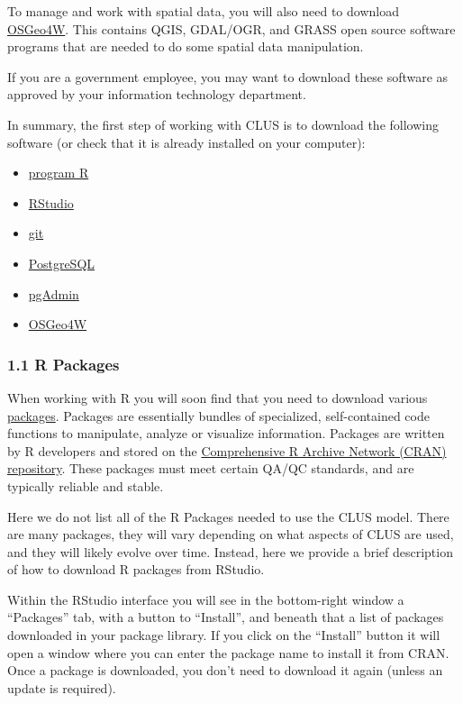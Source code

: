 \documentclass[
]{article}
\providecommand{\tightlist}{%
  \setlength{\itemsep}{0pt}\setlength{\parskip}{0pt}}
\begin{document}
To manage and work with spatial data, you will also need to download
\href{https://trac.osgeo.org/osgeo4w/}{OSGeo4W}. This contains QGIS,
GDAL/OGR, and GRASS open source software programs that are needed to do
some spatial data manipulation.

If you are a government employee, you may want to download these
software as approved by your information technology department.

In summary, the first step of working with CLUS is to download the
following software (or check that it is already installed on your
computer):

\begin{itemize}
\tightlist
\item
  \href{https://cran.r-project.org/bin/windows/base/}{program R}
\item
  \href{https://rstudio.com/products/rstudio/download/}{RStudio}
\item
  \href{https://gitforwindows.org/}{git}
\item
  \href{https://www.postgresql.org/download/}{PostgreSQL}
\item
  \href{https://www.pgadmin.org/}{pgAdmin}
\item
  \href{https://trac.osgeo.org/osgeo4w/}{OSGeo4W}
\end{itemize}

\hypertarget{r-packages}{%
\subsubsection{1.1 R Packages}\label{r-packages}}

When working with R you will soon find that you need to download various
\href{https://rstudio.com/products/rpackages/}{packages}. Packages are
essentially bundles of specialized, self-contained code functions to
manipulate, analyze or visualize information. Packages are written by R
developers and stored on the
\href{https://cran.r-project.org/web/packages/available_packages_by_name.html}{Comprehensive
R Archive Network (CRAN) repository}. These packages must meet certain
QA/QC standards, and are typically reliable and stable.

Here we do not list all of the R Packages needed to use the CLUS model.
There are many packages, they will vary depending on what aspects of
CLUS are used, and they will likely evolve over time. Instead, here we
provide a brief description of how to download R packages from RStudio.

Within the RStudio interface you will see in the bottom-right window a
``Packages'' tab, with a button to ``Install'', and beneath that a list
of packages downloaded in your package library. If you click on the
``Install'' button it will open a window where you can enter the package
name to install it from CRAN. Once a package is downloaded, you don't
need to download it again (unless an update is required).
\end{document}
